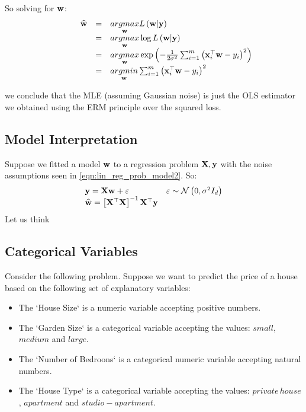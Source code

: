 So solving for $\mathbf{w}$:
$$ 
\begin{array}{ccl}
\quad\quad\quad\widehat{\mathbf{w}} & = & \underset{\mathbf{w}}{argmax}L\left(\mathbf{w}|\mathbf{y}\right) \\
& = & \underset{\mathbf{w}}{argmax}\log L\left(\mathbf{w}|\mathbf{y}\right) \\
& = & \underset{\mathbf{w}}{argmax}\exp\left(-\frac{1}{2\sigma^{2}}\sum_{i=1}^{m}\left(\mathbf{x}_{i}^{\top}\mathbf{w}-y_{i}\right)^{2}\right) \\ 
& = & \underset{\mathbf{w}}{argmin}\sum_{i=1}^{m}\left(\mathbf{x}_{i}^{\top}\mathbf{w}-y_{i}\right)^{2}
\end{array}
$$

we conclude that the MLE (assuming Gaussian noise) is just the OLS estimator we obtained using the ERM principle over the squared loss. %

\subsection{Model Interpretation}
Suppose we fitted a model $\mathbf{w}$ to a regression problem $\mathbf{X},\mathbf{y}$ with the noise assumptions seen in \ref{eqn:lin_reg_prob_model2}. So:
$$
\begin{array}{ll}
\mathbf{y}=\mathbf{X}\mathbf{w}+\varepsilon & \varepsilon \sim\mathcal{N}\left(0,\sigma^2I_d\right)\\
\widehat{\mathbf{w}} = \left[\mathbf{X}^\top\mathbf{X}\right]^{-1}\mathbf{X}^\top\mathbf{y} &
\end{array}
$$
Let us think 




\subsection{Categorical Variables}

Consider the following problem. Suppose we want to predict the price of a house based on the following set of explanatory variables:
\begin{itemize}
	\item The `House Size` is a numeric variable accepting positive numbers.
	\item The `Garden Size` is a categorical variable accepting the values: $small$, $medium$ and $large$.
	\item The `Number of Bedroons` is a categorical numeric variable accepting natural numbers.
	\item The `House Type` is a categorical variable accepting the values: $private\,house$, $apartment$ and $studio-apartment$.
\end{itemize}

